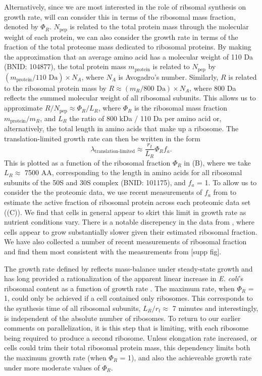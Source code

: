 Alternatively, since we are most interested in the role of ribsomal synthesis on
growth rate, will can consider this in terms of the ribosomal mass fraction, denoted by $\Phi_R$. $N_\text{pep}$ is related to the total protein mass
through the molecular weight of each protein, we can also consider the growth
rate in terms of the fraction of the total proteome mass dedicated to ribosomal
proteins. By making the approximation that an average amino acid has a molecular
weight of 110 Da (BNID: 104877), the total protein mass $m_\text{protein}$ is
related to $N_\text{pep}$ by $(m_\text{protein}/\text{110 Da}) \times N_A$,
where $N_A$ is Avogadro's number. Similarly, $R$ is related to the ribosomal
protein mass by $R \approx (m_R/\text{800 Da}) \times N_A$, where 800 Da
reflects the summed molecular weight of all ribosomal subunits.  This allows us
to approximate  $R / N_\text{pep} \approx \Phi_R / L_R$,  where $\Phi_R$ is the
ribosomal mass fraction $m_\text{protein}/m_R$, and $L_R$ the ratio of 800 kDa /
110 Da per amino acid or, alternatively, the total length in amino acids that
make up a ribosome. The translation-limited growth rate can then be written in
the form
\begin{equation}
\lambda_{\textrm{translation-limited}} \approx \frac{r_t}{L_R}  \Phi_R f_a.
\label{eq:translation_limit_growth_rate}
\end{equation}
This is plotted as a function of the ribosomal fraction $\Phi_R$ in
(B), where we take $L_R \approx$ 7500 AA, corresponding to
the length in amino acids for all ribosomal subunits of the 50S and 30S complex
(BNID: 101175), and $f_a$ = 1. To allow us to consider the the proteomic data,
we use recent measurements of $f_a$ from \cite{dai2016} to estimate the active
fraction of ribosomal protein across each proteomic data set
((C)). We find that cells in general appear to
skirt this limit in growth rate as nutrient conditions vary. There is a notable discrepency
in the data from \cite{peebo2015, valgepea2013}, where cells appear to grow
substantially slower given their estimated ribosomal fraction. We have
also collected a number of recent measurements of ribosomal fraction and
find them most consistent with the measurements from \cite{li2014,
schmidt2016} [supp fig].

The growth rate defined by  reflects
mass-balance under steady-state growth and has long provided a rationalization
of the apparent linear increase in \textit{E. coli}'s ribosomal content as a
function of growth rate \citep{goldberger1979, scott2010}. The maximum rate,
when $\Phi_R$ = 1, could only be achieved if a cell contained only ribosomes.
This corresponds to the synthesis time of all ribosomal subunits, $L_R/ r_t
\approx$ 7 minutes \citep{dill2011} and interestingly, is independent of the
absolute number of ribosomes. To return to our earlier comments on
parallelization,  it is this step that is limiting, with each ribosome being
required to produce a second ribosome. Unless elongation rate increased, or
cells could trim their total ribosomal protein mass, this dependency limits both
the maximum growth rate (when $\Phi_R$ = 1), and also the achieveable growth
rate under more moderate values of $\Phi_R$.

